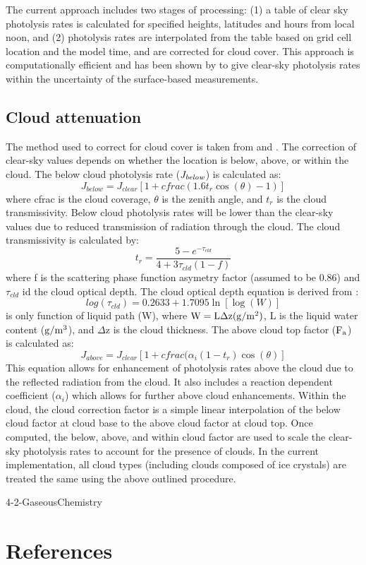 The current approach includes two stages of processing: (1) a table of clear sky photolysis rates is calculated for specified heights, latitudes and hours 
from local noon, and (2)  photolysis rates are interpolated from the table 
based on grid cell location and the model time, and are corrected for cloud 
cover. This approach is computationally efficient and has been shown by 
\cite{Madronich1987} to give clear-sky photolysis rates within the 
uncertainty of the surface-based measurements.

\subsection{Cloud attenuation}
The method used to correct for cloud cover is taken from 
\cite{Chang1987} and \cite{Madronich1987}. The correction of 
clear-sky values depends on whether the location is below, above, or 
within the cloud. The below cloud photolysis rate ($\it J_{below}$) is 
calculated as: 
$$
J_{below} = J_{clear} [ 1 + cfrac(1.6 t_r \cos(\theta) - 1) ]
$$
where cfrac is the cloud coverage, $\theta$ is the zenith angle, and $t_r$ 
is the cloud transmissivity. Below cloud photolysis rates will be lower than 
the clear-sky values due to reduced transmission of radiation through 
the cloud. The cloud transmissivity is calculated by:
$$
 t_r = \frac{5-e^{-\tau_{cld}}}{4 + 3 \tau_{cld} (1 - f)}
$$
where f is the scattering phase function asymetry factor (assumed to be 0.86) 
and $\tau_{cld}$ id the cloud optical depth. The cloud 
optical depth equation is derived  from \cite{Stephens1978}: 
$$
log(\tau_{cld}) = 0.2633 + 1.7095\ln[\log(W)]
$$
is only function of liquid path (W), where $\rm W=L\Delta z (g/m^2)$, L is the 
liquid water content ($\rm g/m^3$), and $\Delta$z is the cloud thickness. 
The above cloud top factor ($\rm F_a$) is calculated as:
$$
J_{above} = J_{clear} [1 + cfrac(\alpha_i (1-t_r)\cos(\theta)]
$$
This equation allows for enhancement of photolysis rates above the cloud 
due to the reflected radiation from the cloud. It also includes a reaction 
dependent coefficient ($\alpha_i$) which allows for further above cloud 
enhancements. Within the cloud, the cloud correction factor is a simple 
linear interpolation of the below cloud factor at cloud base to the above 
cloud factor at cloud top. Once computed, the below, above, and within cloud 
factor are used to scale the clear-sky photolysis rates to account for the 
presence of clouds. In the current implementation, all cloud types (including 
clouds composed of ice crystals) are treated the same using the above outlined
procedure.  

\begin{btSect}{4-2-GaseousChemistry}
\section{References}
\btPrintCited
\end{btSect}
